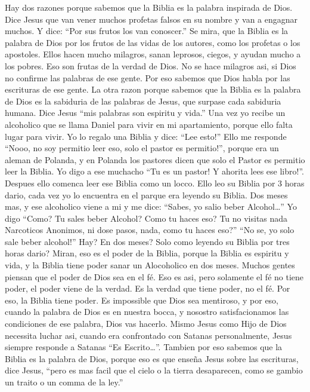 Hay dos razones porque sabemos que la Biblia es la palabra inspirada de
Dios. Dice Jesus que van vener muchos profetas falsos en su nombre y van
a engagnar muchos. Y dice: ``Por sus frutos los van conoscer.'' Se mira,
que la Biblia es la palabra de Dios por los frutos de las vidas de los
autores, como los profetas o los apostoles. Ellos hacen mucho milagros,
sanan leprosos, ciegos, y ayudan mucho a los pobres. Eso son frutas de
la verdad de Dios. No se hace milagros asi, si Dios no confirme las
palabras de ese gente. Por eso sabemos que Dios habla por las escrituras
de ese gente. La otra razon porque sabemos que la Biblia es la palabra
de Dios es la sabiduria de las palabras de Jesus, que surpase cada
sabiduria humana. Dice Jesus ``mis palabras son espiritu y vida.'' Una
vez yo recibe un alcoholico que se llama Daniel para vivir en mi
apartamiento, porque ello falta lugar para vivir. Yo lo regalo una
Biblia y dice: ``Lee esto!'' Ello me responde ``Nooo, no soy permitio
leer eso, solo el pastor es permitio!'', porque era un aleman de
Polanda, y en Polanda los pastores dicen que solo el Pastor es permitio
leer la Biblia. Yo digo a ese muchacho ``Tu es un pastor! Y ahorita lees
ese libro!''. Despues ello comenca leer ese Biblia como un locco. Ello
leo su Biblia por 3 horas dario, cada vez yo lo encuentra en el parque
era leyendo su Biblia. Dos meses mas, y ese alcoholico viene a mi y me
dice: ``Sabes, yo salio beber Alcohol\ldots{}'' Yo digo ``Como? Tu sales
beber Alcohol? Como tu haces eso? Tu no visitas nada Narcoticos
Anonimos, ni dose pasos, nada, como tu haces eso?'' ``No se, yo solo
sale beber alcohol!'' Hay? En dos meses? Solo como leyendo su Biblia por
tres horas dario? Miran, eso es el poder de la Biblia, porque la Biblia
es espiritu y vida, y la Biblia tiene poder sanar un Alocoholico en dos
meses. Muchos gentes piensan que el poder de Dios sea en el fé. Eso es
asi, pero solamente el fé no tiene poder, el poder viene de la verdad.
Es la verdad que tiene poder, no el fé. Por eso, la Biblia tiene poder.
Es impossible que Dios sea mentiroso, y por eso, cuando la palabra de
Dios es en nuestra bocca, y nosostro satisfacionamos las condiciones de
ese palabra, Dios vas hacerlo. Mismo Jesus como Hijo de Dios necessita
luchar asi, cuando era confrontado con Satanas personalmente, Jesus
siempre responde a Satanas ``Es Escrito\ldots{}''. Tambien por eso
sabemos que la Biblia es la palabra de Dios, porque eso es que enseña
Jesus sobre las escrituras, dice Jesus, ``pero es mas facil que el cielo
o la tierra desaparecen, como se gambio un traito o un comma de la
ley.''
